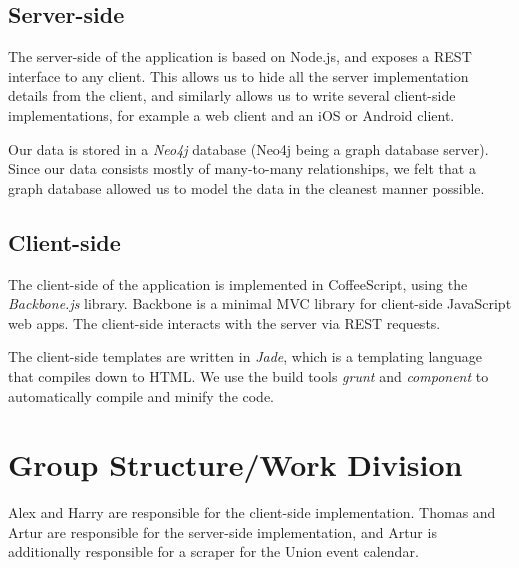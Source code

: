 \documentclass[a4wide, 11pt]{article}
\begin{document}
\subsection*{Server-side}

The server-side of the application is based on Node.js, and exposes a REST interface to any client. This allows us to hide all the server implementation details from the client, and similarly allows us to write several client-side implementations, for example a web client and an iOS or Android client.

Our data is stored in a \textit{Neo4j} database (Neo4j being a graph database server). Since our data consists mostly of many-to-many relationships, we felt that a graph database allowed us to model the data in the cleanest manner possible.

\subsection*{Client-side}

The client-side of the application is implemented in CoffeeScript, using the \textit{Backbone.js} library. Backbone is a minimal MVC library for client-side JavaScript web apps. The client-side interacts with the server via REST requests.

The client-side templates are written in \textit{Jade}, which is a templating language that compiles down to HTML. We use the build tools \textit{grunt} and \textit{component} to automatically compile and minify the code.

\section*{Group Structure/Work Division}

Alex and Harry are responsible for the client-side implementation. Thomas and Artur are responsible for the server-side implementation, and Artur is additionally responsible for a scraper for the Union event calendar.
\end{document}
